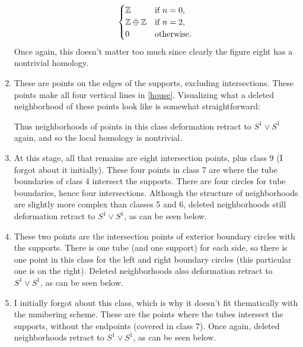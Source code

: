 \begin{solution}
\begin{enumerate}
\[            \begin{cases}
                \Z \quad & \text{if} \ n=0,\\
                \Z\oplus \Z &\text{if} \ n=2,\\
                0 & \text{otherwise.} \ 
            \end{cases}
        \] Once again, this doesn't matter too much since clearly the figure eight has a nontrivial homology.
    \item These are points on the edges of the supports, excluding intersections. These points make all four vertical lines in \cref{house}. Visualizing what a deleted neighborhood of these points look like is somewhat straightforward:
        \begin{figure}[H]
        \centering
        \label{h6}
        \end{figure}
    Thus neighborhoods of points in this class deformation retract to $S^1 \vee S^1 $ again, and so the local homology is nontrivial.
\item At this stage, all that remains are eight intersection points, plus class 9 (I forgot about it initially). These four points in class 7 are where the tube boundaries of class 4 intersect the supports. There are four circles for tube boundaries, hence four intersections. Although the structure of neighborhoods are slightly more complex than classes 5 and 6, deleted neighborhoods still deformation retract to $S^1 \vee S^1 $, as can be seen below.
    \begin{figure}[H]
    \centering
    \label{h7}
    \end{figure}
\item These two points are the intersection points of exterior boundary circles with the supports. There is one tube (and one support) for each side, so there is one point in this class for the left and right boundary circles (this particular one is on the right). Deleted neighborhoods also deformation retract to $S^1 \vee S^1 $, as can be seen below.
    \begin{figure}[H]
    \centering
    \label{h8}
    \end{figure}
\item I initially forgot about this class, which is why it doesn't fit thematically with the numbering scheme. These are the points where the tubes intersect the supports, without the endpoints (covered in class 7). Once again, deleted neighborhoods retract to $S^1 \vee S^1 $, as can be seen below.

\end{enumerate}
\end{solution}
